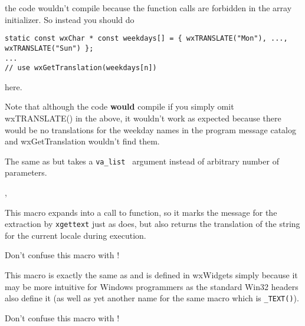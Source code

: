 the code wouldn't compile because the function calls are forbidden in the array
initializer. So instead you should do

\begin{verbatim}
static const wxChar * const weekdays[] = { wxTRANSLATE("Mon"), ..., wxTRANSLATE("Sun") };
...
// use wxGetTranslation(weekdays[n])
\end{verbatim}

here.

Note that although the code {\bf would} compile if you simply omit
wxTRANSLATE() in the above, it wouldn't work as expected because there would be
no translations for the weekday names in the program message catalog and
wxGetTranslation wouldn't find them.

\label{wxvsnprintf}


The same as  but takes a {\tt va\_list }
argument instead of arbitrary number of parameters.


, 



\membersection{\_}\label{underscore}


This macro expands into a call to  
function, so it marks the message for the extraction by {\tt xgettext} just as
 does, but also returns the translation of
the string for the current locale during execution.

Don't confuse this macro with !


\label{underscoret}



This macro is exactly the same as  and is defined in
wxWidgets simply because it may be more intuitive for Windows programmers as
the standard Win32 headers also define it (as well as yet another name for the
same macro which is {\tt \_TEXT()}).

Don't confuse this macro with !



